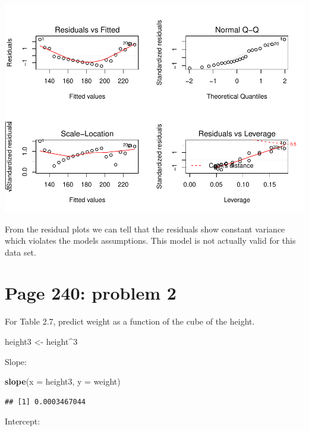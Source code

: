 \documentclass[]{article}
\newenvironment{Shaded}{\begin{snugshade}}{\end{snugshade}}
\newcommand{\KeywordTok}[1]{\textcolor[rgb]{0.13,0.29,0.53}{\textbf{{#1}}}}
\newcommand{\DataTypeTok}[1]{\textcolor[rgb]{0.13,0.29,0.53}{{#1}}}
\newcommand{\DecValTok}[1]{\textcolor[rgb]{0.00,0.00,0.81}{{#1}}}
\newcommand{\StringTok}[1]{\textcolor[rgb]{0.31,0.60,0.02}{{#1}}}
\newcommand{\NormalTok}[1]{{#1}}
\begin{document}
\includegraphics{Christophe_Hunt_hw5_files/figure-latex/unnamed-chunk-9-1.pdf}

From the residual plots we can tell that the residuals show constant
variance which violates the models assumptions. This model is not
actually valid for this data set.

\newpage

\section{Page 240: problem 2}\label{page-240-problem-2}

For Table 2.7, predict weight as a function of the cube of the height.

\begin{Shaded}
\begin{Highlighting}[]
\NormalTok{height3 <-}\StringTok{ }\NormalTok{height^}\DecValTok{3}
\end{Highlighting}
\end{Shaded}

Slope:

\begin{Shaded}
\begin{Highlighting}[]
\KeywordTok{slope}\NormalTok{(}\DataTypeTok{x =} \NormalTok{height3, }\DataTypeTok{y =} \NormalTok{weight)}
\end{Highlighting}
\end{Shaded}

\begin{verbatim}
## [1] 0.0003467044
\end{verbatim}

Intercept:
\end{document}
